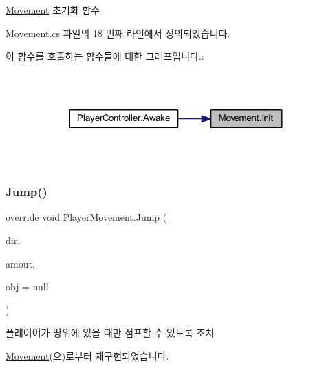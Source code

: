 \mbox{\hyperlink{class_movement}{Movement}} 초기화 함수 



Movement.\+cs 파일의 18 번째 라인에서 정의되었습니다.


\begin{DoxyCode}{0}

\end{DoxyCode}
이 함수를 호출하는 함수들에 대한 그래프입니다.\+:
\nopagebreak
\begin{figure}[H]
\begin{center}
\leavevmode
\includegraphics[width=311pt]{d1/de2/class_movement_a1c50c07edbe274e1cf55253e87506684_icgraph}
\end{center}
\end{figure}
\mbox{\label{class_player_movement_a64ce92029a6d91f12d23332bdd44a6ab}} 
\subsubsection{\texorpdfstring{Jump()}{Jump()}}
{\footnotesize\ttfamily override void Player\+Movement.\+Jump (\begin{DoxyParamCaption}\item[{Vector2}]{dir,  }\item[{float}]{amout,  }\item[{Game\+Object}]{obj = {\ttfamily null} }\end{DoxyParamCaption})\hspace{0.3cm}{\ttfamily [virtual]}}



플레이어가 땅위에 있을 때만 점프할 수 있도록 조치 



\mbox{\hyperlink{class_movement_a561e8f643a3f3cd6b0b6789c72161e98}{Movement}}(으)로부터 재구현되었습니다.




